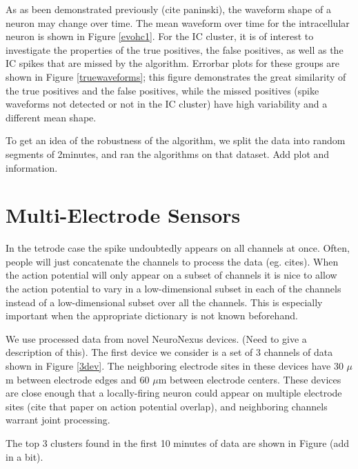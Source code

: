 As as been demonstrated previously (cite paninski), the waveform shape of a neuron may change over time.  The mean waveform over time for the intracellular neuron is shown in Figure \ref{evohc1}.  For the IC cluster, it is of interest to investigate the properties of the true positives, the false positives, as well as the IC spikes that are missed by the algorithm.  Errorbar plots for these groups are shown in Figure \ref{truewaveforms}; this figure demonstrates the great similarity of the true positives and the false positives, while the missed positives (spike waveforms not detected or not in the IC cluster) have high variability and a different mean shape.

To get an idea of the robustness of the algorithm, we split the data into random segments of 2minutes, and ran the algorithms on that dataset.  Add plot and information.
\section{Multi-Electrode Sensors}
In the tetrode case the spike undoubtedly appears on all channels at once.  Often, people will just concatenate the channels to process the data (eg. cites).  When the action potential will only appear on a subset of channels it is nice to allow the action potential to vary in a low-dimensional subset in each of the channels instead of a low-dimensional subset over all the channels.  This is especially important when the appropriate dictionary is not known beforehand.

We use processed data from novel NeuroNexus devices.  (Need to give a description of this).  The first device we consider is a set of 3 channels of data shown in Figure \ref{3dev}.  The neighboring electrode sites in these devices have 30 $\mu$m between electrode edges and 60 $\mu$m between electrode centers.  These devices are close enough that a locally-firing neuron could appear on multiple electrode sites (cite that paper on action potential overlap), and neighboring channels warrant joint processing.

 The top 3 clusters found in the first 10 minutes of data are shown in Figure (add in a bit).



